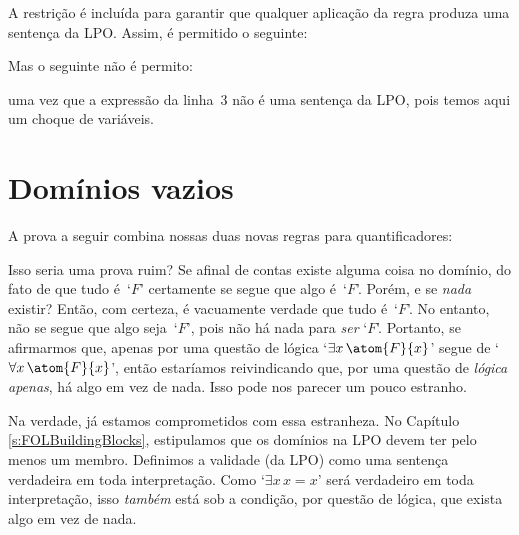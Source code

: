 A restri\c c\~ao \'e inclu\'ida para garantir que qualquer aplica\c c\~ao da regra produza uma senten\c ca da LPO. Assim, \'e permitido o seguinte:

\begin{fitchproof}
	 
	 
\end{fitchproof}
Mas o seguinte  n\~ao \'e permito:
\begin{fitchproof}
	 
\end{fitchproof}
uma vez que a express\~ao da linha~3 n\~ao \'e uma senten\c ca da LPO, pois 
temos aqui um choque de vari\'aveis.

\section{Dom\'inios vazios}
A prova a seguir combina nossas duas novas regras para quantificadores:
	\begin{fitchproof}
	\end{fitchproof}
Isso seria uma prova ruim? 
Se afinal de contas existe alguma coisa no domínio, do fato de que tudo \'e~`$F$'
certamente se segue que algo \'e~`$F$'.  Por\'em, e se \emph{nada} existir? Ent\~ao, com certeza, \'e vacuamente verdade que tudo \'e~`$F$'. No entanto, n\~ao se segue que algo seja~`$F$', pois n\~ao h\'a nada para \emph{ser}  `$F$'. Portanto, se afirmarmos que, apenas por uma quest\~ao de l\'ogica  `$\exists x\,\atom{F}{x}$' segue de `$\forall x\,\atom{F}{x}$', ent\~ao estar\'iamos reivindicando que,   por uma quest\~ao de \emph{l\'ogica apenas}, h\'a algo em vez de nada. Isso pode nos parecer um pouco estranho.

Na verdade,  j\'a estamos comprometidos com essa estranheza. No Capítulo  \ref{s:FOLBuildingBlocks},  estipulamos que os dom\'inios na LPO devem ter pelo menos um membro. Definimos a validade    (da LPO)  como uma senten\c ca verdadeira em toda interpreta\c c\~ao. Como `$\exists x\, x=x$' ser\'a verdadeiro em toda interpreta\c c\~ao, isso \emph{tamb\'em} est\'a sob a condi\c c\~ao, por quest\~ao de l\'ogica,  que exista algo em vez de nada.

